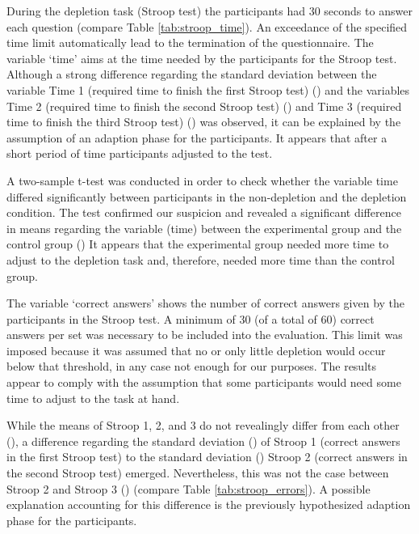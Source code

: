 During the depletion task (Stroop test) the participants had 30 seconds to answer each question (compare Table \ref{tab:stroop_time}). An exceedance of the specified time limit automatically lead to the termination of the questionnaire.  The variable ‘time’ aims at the time needed by the participants for the Stroop test. Although a strong difference regarding the standard deviation between the variable Time 1 (required time to finish the first Stroop test) () and the variables Time 2 (required time to finish the second Stroop test) () and Time 3 (required time to finish the third Stroop test) () was observed, it can be explained by the assumption of an adaption phase for the participants. It appears that after a short period of time participants adjusted to the test.\par
A two-sample t-test was conducted in order to check whether the variable time differed significantly between participants in the non-depletion and the depletion condition. The test confirmed our suspicion and revealed a significant difference in means regarding the variable (time) between the experimental group and the control group () It appears that the experimental group needed more time to adjust to the depletion task and, therefore, needed more time than the control group. \par
The variable ‘correct answers’ shows the number of correct answers given by the participants in the Stroop test. A minimum of 30 (of a total of 60) correct answers per set was necessary to be included into the evaluation. This limit was imposed because it was assumed that no or only little depletion would occur below that threshold, in any case not enough for our purposes. The results appear to comply with the assumption that some participants would need some time to adjust to the task at hand. \par
While the means of Stroop 1, 2, and 3 do not revealingly differ from each other (), a difference regarding the standard deviation () of Stroop 1 (correct answers in the first Stroop test) to the standard deviation () Stroop 2 (correct answers in the second Stroop test) emerged. Nevertheless, this was not the case between Stroop 2 and Stroop 3 () (compare Table \ref{tab:stroop_errors}). A possible explanation accounting for this difference is the previously hypothesized adaption phase for the participants.\par

